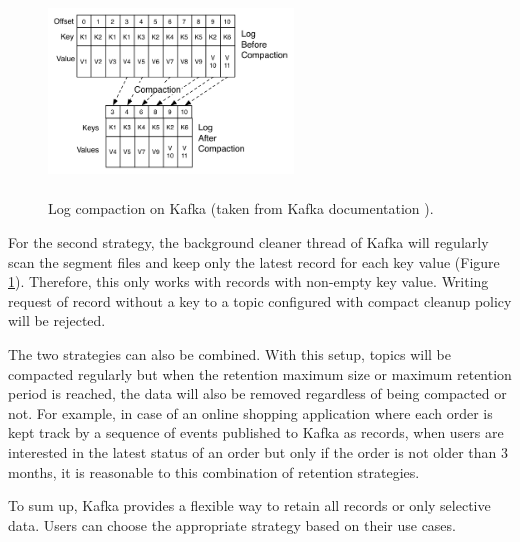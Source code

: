 \begin{figure}[h]
	\centering
	\includegraphics[width=6.5cm,height=5.5cm]{images/compact-kafka.png}
	\caption{Log compaction on Kafka (taken from Kafka documentation \cite{kafkadocumentation}).}
	\label{fig:compactekafka}
\end{figure}
For the second strategy, the background cleaner thread of Kafka will regularly scan the segment files and keep only the latest record for each key value (Figure \ref{fig:compactekafka}). Therefore, this only works with records with non-empty key value. Writing request of record without a key to a topic configured with compact cleanup policy will be rejected.


The two strategies can also be combined. With this setup, topics will be compacted regularly but when the retention maximum size or maximum retention period is reached, the data will also be removed regardless of being compacted or not. For example, in case of an online shopping application where each order is kept track by a sequence of events published to Kafka as records, when users are interested in the latest status of an order but only if the order is not older than 3 months, it is reasonable to this combination of retention strategies.

To sum up, Kafka provides a flexible way to retain all records or only selective data. Users can choose the appropriate strategy based on their use cases. 





